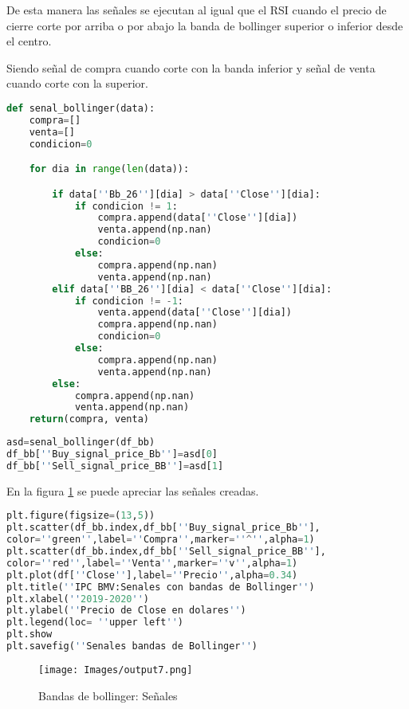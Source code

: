 \documentclass[letterpaper,12pt,oneside]{book}
\begin{document}
De esta manera las señales se ejecutan al igual que el RSI cuando el precio de cierre corte por arriba o por abajo la banda de bollinger superior o inferior desde el centro.

Siendo señal de compra cuando corte con la banda inferior y señal de venta cuando corte con la superior.



\begin{lstlisting}[language=Python]
def senal_bollinger(data):
    compra=[]
    venta=[]
    condicion=0

    for dia in range(len(data)):

        if data[''Bb_26''][dia] > data[''Close''][dia]:
            if condicion != 1:
                compra.append(data[''Close''][dia])
                venta.append(np.nan)
                condicion=0
            else:
                compra.append(np.nan)
                venta.append(np.nan)
        elif data[''BB_26''][dia] < data[''Close''][dia]:
            if condicion != -1:
                venta.append(data[''Close''][dia])
                compra.append(np.nan)
                condicion=0
            else:
                compra.append(np.nan)
                venta.append(np.nan)
        else:
            compra.append(np.nan)
            venta.append(np.nan)
    return(compra, venta)
\end{lstlisting}   
    
    
\begin{lstlisting}[language=Python]   
asd=senal_bollinger(df_bb)
df_bb[''Buy_signal_price_Bb'']=asd[0]
df_bb[''Sell_signal_price_BB'']=asd[1]
\end{lstlisting}

En la figura \ref{fig:m9} se puede apreciar las señales creadas.

\begin{lstlisting}[language=Python]
plt.figure(figsize=(13,5))
plt.scatter(df_bb.index,df_bb[''Buy_signal_price_Bb''],
color=''green'',label=''Compra'',marker=''^'',alpha=1)
plt.scatter(df_bb.index,df_bb[''Sell_signal_price_BB''],
color=''red'',label=''Venta'',marker=''v'',alpha=1)
plt.plot(df[''Close''],label=''Precio'',alpha=0.34)
plt.title(''IPC BMV:Senales con bandas de Bollinger'')
plt.xlabel(''2019-2020'')
plt.ylabel(''Precio de Close en dolares'')
plt.legend(loc= ''upper left'')
plt.show
plt.savefig(''Senales bandas de Bollinger'')
\end{lstlisting}


\begin{figure}[ht]
	\centering
	\texttt{[image: Images/output7.png]}
	\caption{Bandas de bollinger: Señales}
	\label{fig:m9}
\end{figure}
\end{document}
